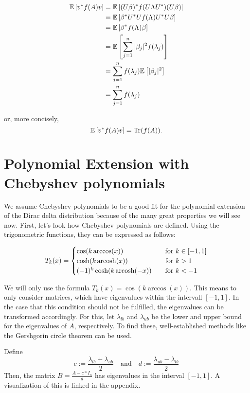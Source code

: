 \begin{align*}
    \mathbb{E}\left[v^* f(A) v\right] &= \mathbb{E}\left[(U\beta)^* f(U\Lambda U^*) (U\beta)\right] \\
        &= \mathbb{E}\left[\beta^* U^* U f(\Lambda) U^* U \beta\right] \\
        &= \mathbb{E}\left[\beta^* f(\Lambda) \beta\right] \\
        &= \mathbb{E}\left[\sum_{j = 1}^n |\beta_j|^2 f(\lambda_j) \right] \\
        &= \sum_{j = 1}^n f(\lambda_j) \mathbb{E}\left[ |\beta_j|^2 \right] \\
        &= \sum_{j = 1}^n f(\lambda_j)
\end{align*}

or, more concisely,
\begin{equation} \label{eq:theorem_result}
    \mathbb{E}\left[v^* f(A) v\right] = \operatorname{Tr}(f(A)).
\end{equation}

\section{Polynomial Extension with Chebyshev polynomials}
We assume Chebyshev polynomials to be a good fit for the polynomial extension of the Dirac delta distribution
because of the many great properties we will see now. First, let's look how Chebyshev polynomials are defined.
Using the trigonometric functions, they can be expressed as follows:

\[ T_k(x) =
\begin{cases}

\cos(k \arccos(x))                & \quad \text{for } k \in [-1, 1]\\
    \cosh(k \operatorname{arcosh}(x))           & \quad \text{for } k > 1\\
    (-1)^k \cosh(k \operatorname{arcosh}(-x))   & \quad \text{for } k < -1
\end{cases}
\]

We will only use the formula $T_k(x) = \cos(k \arccos(x))$.
This means to only consider matrices, which have eigenvalues within the intervall $[-1, 1]$.
In the case that this condition should not be fulfilled, the eigenvalues can be transformed accordingly.
For this, let $\lambda_{lb}$ and $\lambda_{ub}$ be the lower and upper bound for the eigenvalues of $A$, respectively.
To find these, well-established methods like the Gershgorin circle theorem can be used.

Define
\[
c := \frac{\lambda_{lb} + \lambda_{ub}}{2} \quad \text{and} \quad d := \frac{\lambda_{ub} - \lambda_{lb}}{2}
\]
Then, the matrix $B = \frac{A - c*I_n}{d}$ has eigenvalues in the interval $[-1, 1]$.
A visualization of this is linked in the appendix.


